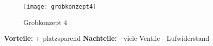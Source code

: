 \newpage
\begin{wrapfigure}{r}{0.5\textwidth}
  \begin{center}
    \texttt{[image: grobkonzept4]}
  \end{center}
  \caption{Grobkonzept 4}
\end{wrapfigure}


\textbf{Vorteile:}							\newline
+ 	platzsparend								\newline
\newline
\textbf{Nachteile:}\newline
-	viele Ventile								\newline
-	Lufwiderstand							\newline
\WFclear			
\newpage